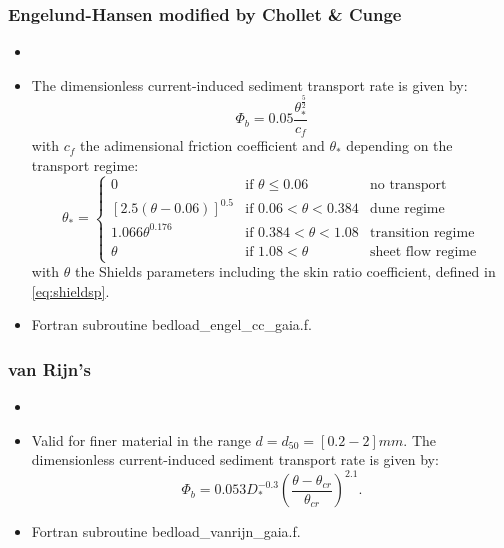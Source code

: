 \subsubsection{Engelund-Hansen modified by Chollet \& Cunge}
\begin{itemize}
 \item {}
 \item The dimensionless current-induced sediment transport rate is given by:
  \begin{equation*}
  \Phi_b=0.05 \frac{\theta_*^{\frac{5}{2}}}{c_f}
  \end{equation*}
 with $c_f$ the adimensional friction coefficient and $\theta_*$ depending on the transport regime:
\begin{equation*}
\theta_*=\left\{\begin{array}{lll}
0 & \text{if}\,\,\theta \leq 0.06 & \text{no transport}  \\
\left[2.5\left(\theta-0.06\right)\right]^{0.5} & \text{if}\,\,0.06<\theta <0.384 & \text{dune regime}\\
1.066\theta^{0.176} & \text{if}\,\,0.384<\theta <1.08 & \text{transition regime}\\
\theta & \text{if}\,\,1.08<\theta & \text{sheet flow regime}
\end{array}
\right.
\end{equation*}
with $\theta$ the Shields parameters including the skin ratio coefficient, defined in \eqref{eq:shieldsp}.
\item Fortran subroutine {\ttfamily bedload\_engel\_cc\_gaia.f}.
\end{itemize}

\subsubsection{van Rijn's}
\begin{itemize}
\item {}
\item Valid for finer material in the range $d = d_{50} = [0.2-2]mm$. The dimensionless current-induced sediment transport rate is given by:
\begin{equation*}
\Phi_b = 0.053 D_*^{-0.3} \left( \frac{\theta-\theta_{cr}}{\theta_{cr}} \right)^{2.1}.
\end{equation*}

\item Fortran subroutine {\ttfamily bedload\_vanrijn\_gaia.f}.
\end{itemize}

